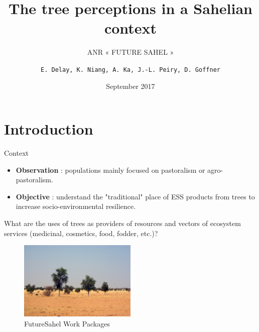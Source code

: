 \documentclass[newPxFont]{beamer}
\title{The tree perceptions in a Sahelian context}
\subtitle{ANR « FUTURE SAHEL »}
\date{September 2017}
\author{\texttt{E. Delay,  K. Niang, A. Ka, J.-L. Peiry, D. Goffner}}
\institute{Presentation at Stockholm Resilience Center}
\begin{document}
%
%

\maketitle


%
%


\section{Introduction}

\begin{frame}[c]{Context}
\vspace{-1cm}
\begin{itemize}
  \item \textbf{Observation} : populations mainly focused on pastoralism or agro-pastoralism.
  \item \textbf{Objective} : understand the "traditional" place of ESS products from trees to increase socio-environmental resilience.
\end{itemize}

What are the uses of trees as providers of resources and vectors of ecosystem services (medicinal, cosmetics, food, fodder, etc.)?

\begin{figure}
	\centering
	\includegraphics[width = 0.5\textwidth]{img/2007_Podor.JPG}
	\caption{FutureSahel Work Packages}
\end{figure}
\end{frame}
\end{document}
